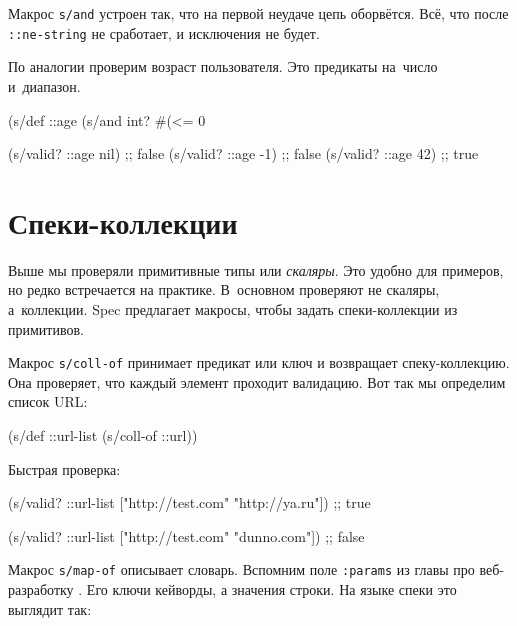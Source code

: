 Макрос \verb|s/and| устроен так, что на первой неудаче цепь
оборвётся. Всё, что после \verb|::ne-string| не сработает, и
исключения не будет.

По аналогии проверим возраст пользователя. Это предикаты на~число и~диапазон.


\begin{english}
  \begin{clojure}
(s/def ::age
  (s/and int? #(<= 0 %

(s/valid? ::age nil) ;; false
(s/valid? ::age -1)  ;; false
(s/valid? ::age 42)  ;; true
  \end{clojure}
\end{english}

\section{Спеки-коллекции}


Выше мы проверяли примитивные типы или \emph{скаляры}. Это удобно для примеров,
но редко встречается на практике. В~основном проверяют не скаляры,
а~коллекции. Spec предлагает макросы, чтобы задать спеки-коллекции из
примитивов.


Макрос \verb|s/coll-of| принимает предикат или ключ и возвращает
спеку-коллекцию. Она проверяет, что каждый элемент проходит валидацию. Вот так
мы определим список URL:

\begin{english}
  \begin{clojure}
(s/def ::url-list (s/coll-of ::url))
  \end{clojure}
\end{english}

\noindent
Быстрая проверка:

\begin{english}
  \begin{clojure}
(s/valid? ::url-list ["http://test.com" "http://ya.ru"])
;; true

(s/valid? ::url-list ["http://test.com" "dunno.com"])
;; false
  \end{clojure}
\end{english}


Макрос \verb|s/map-of| описывает словарь. Вспомним поле \verb|:params| из
главы про веб-разработку . Его ключи кейворды, а значения
строки. На языке спеки это выглядит так:

